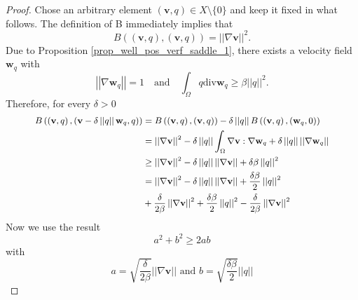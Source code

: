 \documentclass[12pt,a4paper]{article}
\theoremstyle{definition}
\begin{document}
\begin{proof}
Chose an arbitrary element $\left(\textbf{v},q\right)\in X\setminus \lbrace 0 \rbrace$ and keep it fixed in what follows.  The definition of B immediately implies that 
\begin{equation}\nonumber
B\left(\left(\textbf{v},q\right),\left(\textbf{v},q\right)\right)= \left|\left|\nabla \textbf{v}\right|\right|^2.
\end{equation}
Due to Proposition \ref{prop_well_pos_verf_saddle_1}, there exists a velocity field $\textbf{w}_q$ with
\begin{equation}\nonumber
\left|\left|\nabla \textbf{w}_q\right|\right|=1 \quad \text{and}\quad \int_{\Omega}q \text{div} \textbf{w}_q \geq \beta \left|\left|q\right|\right|^2.
\end{equation}
Therefore, for every $\delta > 0$
\begin{equation}\nonumber\small
\begin{aligned}\small
B\left(\left(\textbf{v},q\right),\left(\textbf{v}-\delta\left|\left|q\right|\right|\textbf{w}_q,q\right)\right) &= B\left(\left(\textbf{v},q\right),\left(\textbf{v},q\right)\right)-\delta\left|\left|q\right|\right|B\left(\left(\textbf{v},q\right),\left(\textbf{w}_q,0\right)\right)\\
&=\left|\left|\nabla \textbf{v}\right|\right|^2 -  \delta\left|\left|q\right|\right|\int_{\Omega}\nabla\textbf{v}:\nabla\textbf{w}_q +\delta\left|\left|q\right|\right|\left|\left|\nabla \textbf{w}_q\right|\right|\\
&\geq \left|\left|\nabla \textbf{v}\right|\right|^2 -  \delta\left|\left|q\right|\right|\left|\left|\nabla \textbf{v}\right|\right| +\delta \beta \left|\left|q\right|\right|^2\\
&= \left|\left|\nabla \textbf{v}\right|\right|^2 -  \delta\left|\left|q\right|\right|\left|\left|\nabla \textbf{v}\right|\right| +\frac{\delta \beta }{2}\left|\left|q\right|\right|^2\\& + \frac{\delta}{2\beta}\left|\left|\nabla\textbf{v}\right|\right|^2 +\frac{\delta \beta }{2}\left|\left|q\right|\right|^2 - \frac{\delta}{2\beta}\left|\left|\nabla\textbf{v}\right|\right|^2
\end{aligned}
\end{equation}
Now we use the result
\begin{equation}
a^2+b^2\geq 2ab \nonumber
\end{equation}
with \begin{equation}\nonumber
a=\sqrt{\frac{\delta}{2\beta}}\left|\left|\nabla\textbf{v}\right|\right|\text{ and } b = \sqrt{\frac{\delta \beta }{2}}\left|\left|q\right|\right|

\end{equation}
\end{proof}
\end{document}
